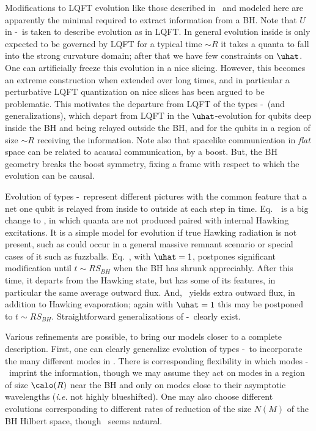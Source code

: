 Modifications to LQFT evolution like those described in \NLvC\ and modeled here are apparently the minimal required to extract information from a BH.  Note that $U$ in \evolone-\evolthree\ is taken to describe evolution as in LQFT.  In general evolution inside is only expected to be governed by LQFT for a typical time $\sim R$ it takes a quanta to fall into the strong curvature domain; after that we have few constraints on $\uhat$.  One can artificially freeze this evolution in a nice slicing.  However, this becomes an extreme construction when extended over long times, and in particular a perturbative LQFT quantization on nice slices has been argued to be problematic.  This motivates the departure from LQFT of the types \evolone-\evolthree\ (and generalizations), which depart from LQFT in the $\uhat$-evolution for qubits deep inside the BH and being relayed outside the BH, and for the qubits in a region of size $\sim R$ receiving the information.  Note also that spacelike communication in {\it flat} space can be related to acausal communication, by a boost.  But, the BH geometry breaks the boost symmetry, fixing a frame with respect to which the evolution can be causal.

Evolution of types \evolone-\evolthree\ represent different pictures with the common feature that a net one qubit is relayed from inside to outside at each step in time.  Eq.~\evolone\ is a big change to \hawkstate, in which quanta are not produced paired with internal Hawking excitations.  It is a simple model for evolution if true Hawking radiation is not present, such as could occur in a general massive remnant scenario or special cases of it such as fuzzballs.  Eq.~\evoltwo, with $\uhat=1$, postpones significant modification until $t\sim R S_{BH}$ when the BH has shrunk appreciably. After this time, it departs from the Hawking state, but has some of its features, in particular the same average outward flux.  And, \evolthree\ yields extra outward flux, in addition to Hawking evaporation; again with $\uhat=1$ this may be postponed to $t\sim R S_{BH}$.  Straightforward generalizations of \evolone-\evolthree\ clearly exist.


Various refinements are possible, to bring our models closer to a complete description.  First, one can clearly generalize evolution of types \evolone-\evolthree\ to incorporate the many different modes in \hawkstate.  There is corresponding flexibility in which modes \evolone-\evolthree\ imprint the information, though we may assume they act on modes in a region of size $\calo(R)$ near the BH and only on modes close to their asymptotic wavelengths ({\it i.e.} not highly blueshifted).  One may also choose different evolutions corresponding to different rates of reduction of the size $N(M)$ of the BH Hilbert space, though \ndof\ seems natural.  

